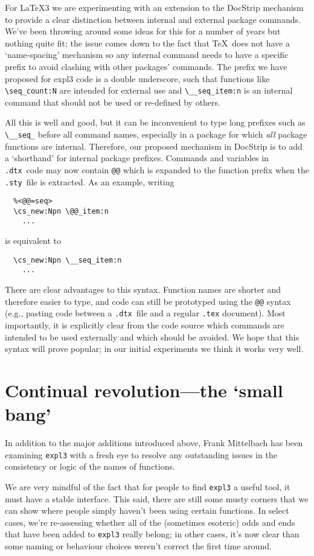 \documentclass{ltnews}
\def\DTX{\texttt{.dtx}}
\def\STY{\texttt{.sty}}
\begin{document}
For \LaTeX3 we are experimenting with an extension to the \textsf{DocStrip} mechanism to provide a clear distinction between internal and external package commands.
We've been throwing around some ideas for this for a number of years but nothing quite fit; the issue comes down to the fact that \TeX\ does not have a `name-spacing' mechanism so any internal command needs to have a specific prefix to avoid clashing with other packages' commands.
The prefix we have proposed for \textsf{expl3} code is a double underscore, such that functions like \verb|\seq_count:N| are intended for external use and \verb|\__seq_item:n| is an internal command that should not be used or re-defined by others.

All this is well and good, but it can be inconvenient to type long prefixes such as \verb|\__seq_| before all command names, especially in a package for which \emph{all} package functions are internal.
Therefore, our proposed mechanism in \textsf{DocStrip} is to add a `shorthand' for internal package prefixes.
Commands and variables in \DTX\ code may now contain \texttt{@@} which is expanded to the function prefix when the \STY\ file is extracted.
As an example, writing
\begin{verbatim}
  %<@@=seq>
  \cs_new:Npn \@@_item:n
    ...
\end{verbatim}
is equivalent to
\begin{verbatim}
  \cs_new:Npn \__seq_item:n
    ...
\end{verbatim}
There are clear advantages to this syntax.
Function names are shorter and therefore easier to type, and code can still be prototyped using the \texttt{@@} syntax
(e.g., pasting code between a \DTX\ file and a regular \texttt{.tex} document).
Most importantly, it is explicitly clear from the code source which commands are intended to be used externally and which should be avoided.
We hope that this syntax will prove popular; in our initial experiments we think it works very well.

\section{Continual revolution---the `small bang'}

In addition to the major additions introduced above, Frank Mittelbach has been examining \texttt{expl3} with a fresh eye to resolve any outstanding issues in the consistency or logic of the names of functions.

We are very mindful of the fact that for people to find \texttt{expl3} a useful tool, it must have a stable interface.
This said, there are still some musty corners that we can show where people simply haven't been using certain functions.
In select cases, we're re-assessing whether all of the (sometimes esoteric) odds and ends that have been added to \texttt{expl3} really belong; in other cases, it's now clear than some naming or behaviour choices weren't correct the first time around.
\end{document}
